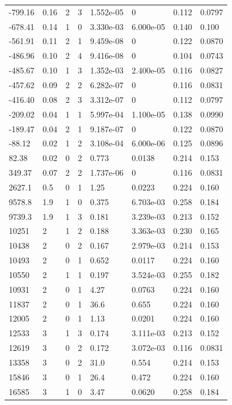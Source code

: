 \documentclass[preview]{standalone}
\begin{document}
{{\begin{tabular}{L{1.2cm}C{1.2cm} C{0.3cm}C{0.5cm} C{1.4cm}C{1.4cm} C{1.4cm}C{1.4cm}}
  -799.16  &  0.16  & 2     &  3 &  1.552e-05  & 0  & 0.112 &  0.0797   \\ 
  -678.41  &  0.14  & 1     &  0 &  3.330e-03  & 6.000e-05  & 0.140 &  0.100   \\ 
  -561.91  &  0.11  & 2     &  1 &  9.459e-08  & 0  & 0.122 &  0.0870   \\ 
  -486.96  &  0.10  & 2     &  4 &  9.416e-08  & 0  & 0.104 &  0.0743   \\ 
  -485.67  &  0.10  & 1     &  3 &  1.352e-03  & 2.400e-05  & 0.116 &  0.0827   \\ 
  -457.62  &  0.09  & 2     &  2 &  6.282e-07  & 0  & 0.116 &  0.0831   \\ 
  -416.40  &  0.08  & 2     &  3 &  3.312e-07  & 0  & 0.112 &  0.0797   \\ 
  -209.02  &  0.04  & 1     &  1 &  5.997e-04  & 1.100e-05  & 0.138 &  0.0990   \\ 
  -189.47  &  0.04  & 2     &  1 &  9.187e-07  & 0  & 0.122 &  0.0870   \\ 
  -88.12  &  0.02  & 1     &  2 &  3.108e-04  & 6.000e-06  & 0.125 &  0.0896   \\ 
  82.38  &  0.02  & 0     &  2 &  0.773  & 0.0138  & 0.214 &  0.153   \\ 
  349.37  &  0.07  & 2     &  2 &  1.737e-06  & 0  & 0.116 &  0.0831   \\ 
  2627.1  &   0.5  & 0     &  1 &  1.25  & 0.0223  & 0.224 &  0.160   \\ 
  9578.8  &   1.9  & 1     &  0 &  0.375  & 6.703e-03  & 0.258 &  0.184   \\ 
  9739.3  &   1.9  & 1     &  3 &  0.181  & 3.239e-03  & 0.213 &  0.152   \\ 
  10251  &     2  & 1     &  2 &  0.188  & 3.363e-03  & 0.230 &  0.165   \\ 
  10438  &     2  & 0     &  2 &  0.167  & 2.979e-03  & 0.214 &  0.153   \\ 
  10493  &     2  & 0     &  1 &  0.652  & 0.0117  & 0.224 &  0.160   \\ 
  10550  &     2  & 1     &  1 &  0.197  & 3.524e-03  & 0.255 &  0.182   \\ 
  10931  &     2  & 0     &  1 &  4.27  & 0.0763  & 0.224 &  0.160   \\ 
  11837  &     2  & 0     &  1 &  36.6  & 0.655  & 0.224 &  0.160   \\ 
  12005  &     2  & 0     &  1 &  1.13  & 0.0201  & 0.224 &  0.160   \\ 
  12533  &     3  & 1     &  3 &  0.174  & 3.111e-03  & 0.213 &  0.152   \\ 
  12619  &     3  & 0     &  2 &  0.172  & 3.072e-03  & 0.116 &  0.0831   \\ 
  13358  &     3  & 0     &  2 &  31.0  & 0.554  & 0.214 &  0.153   \\ 
  15846  &     3  & 0     &  1 &  26.4  & 0.472  & 0.224 &  0.160   \\ 
  16585  &     3  & 1     &  0 &  3.47  & 0.0620  & 0.258 &  0.184   \\ 
\hline 
\end{tabular} 

}}
\end{document}
